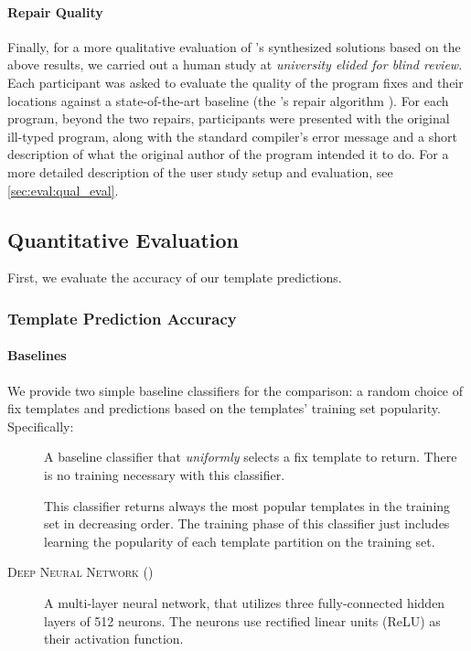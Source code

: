 \paragraph{Repair Quality}
Finally, for a more qualitative evaluation of \toolname's synthesized solutions
based on the above results, we carried out a human study at \emph{university
elided for blind review}. Each participant was asked to evaluate the quality of
the program fixes and their locations against a state-of-the-art baseline (the
\seminal's repair algorithm \citep{Lerner2007-dt}). For each program, beyond the
two repairs, participants were presented with the original ill-typed program,
along with the standard \ocaml compiler's error message and a short description
of what the original author of the program intended it to do. For a more
detailed description of the user study setup and evaluation, see
\autoref{sec:eval:qual_eval}.

\subsection{Quantitative Evaluation}
\label{sec:eval:quan_eval}

First, we evaluate the accuracy of our template predictions.


\subsubsection{Template Prediction Accuracy}
\label{subsec:eval:templ_acc}

\paragraph{Baselines}
We provide two simple baseline classifiers for the comparison: a random choice
of fix templates and predictions based on the templates' training set
popularity. Specifically:
\begin{description}
  \item[\random] A baseline classifier that \emph{uniformly} selects a fix
    template to return. There is no training necessary with this classifier.
  \item[\popular] This classifier returns always the most popular templates in
    the training set in decreasing order. The training phase of this classifier
    just includes learning the popularity of each template partition on the
    training set.
  \item[\textsc{Deep Neural Network} (\dnn)] A multi-layer neural network, that
    utilizes three fully-connected hidden layers of 512 neurons. The neurons use
    rectified linear units (ReLU) as their activation function.
\end{description}

